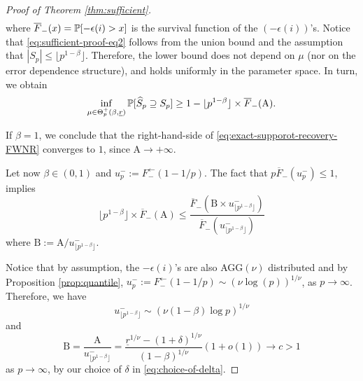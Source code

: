 \begin{proof}[Proof of Theorem \ref{thm:sufficient}]
\begin{align}
\end{align}
where $\overline{F}_-(x) = \P[-\epsilon(i)>x]$ is the survival function of the $(-\epsilon(i))$'s.
Notice that \eqref{eq:sufficient-proof-eq2} follows from the union bound and the assumption that ${|S_p|}\le{\lfloor p^{1-\beta}\rfloor}$. 
Therefore, the lower bound does not depend on $\mu$ (nor on the error dependence structure), and holds uniformly in the parameter space. In turn, we obtain 
\begin{equation} \label{eq:exact-supporot-recovery-FWNR}
    \inf_{\mu\in\Theta_p^+(\beta, \underline{r})} \P[\widehat{S}_p \supseteq S_p] \ge 1 - \lfloor p^{1-\beta} \rfloor \times \overline{F}_-(\text{A}).
\end{equation}

If $\beta=1$, we conclude that the right-hand-side of \eqref{eq:exact-supporot-recovery-FWNR} 
converges to $1$, since $\text{A}\to+\infty$.

Let now $\beta\in (0,1)$ and $u_p^- :=  F_-^{\leftarrow}(1-1/p)$. 
The fact that $p\overline{F}_-(u_p^-) \le 1$, implies
\begin{equation}
    \lfloor p^{1-\beta} \rfloor \times \overline{F}_-(\text{A}) \le 
    \frac{\overline{F}_-\left(\text{B}\times{u_{\lfloor p^{1-\beta}\rfloor}^-}\right)} {\overline{F}_-\left({u_{\lfloor p^{1-\beta}\rfloor}^-}\right)} \label{eq:sufficient-proof-eq3}
\end{equation}
where $\text{B} := {\text{A}}/{u_{\lfloor p^{1-\beta}\rfloor}^-}$.

Notice that by assumption, the $-\epsilon(i)$'s are also 
AGG$(\nu)$ distributed and by Proposition \ref{prop:quantile}, 
$u_p^{-}:= F_-^{\leftarrow}(1-1/p) \sim (\nu \log(p))^{1/\nu}$,
as $p\to\infty$. Therefore, we have
\begin{equation} \label{eq:sufficient-proof-eq4}
    u_{\lfloor p^{1-\beta}\rfloor}^- \sim \left(\nu(1-\beta)\log{p}\right)^{1/\nu}
\end{equation}
and 
\begin{equation*}
\text{B} = \frac{\text{A}}{u_{\lfloor p^{1-\beta}\rfloor}^-}
= \frac{\underline{r}^{1/\nu} - (1+\delta)^{1/\nu}}{(1-\beta)^{1/\nu}}\left(1+o(1)\right) \to c>1
\end{equation*}
as $p\to\infty$, by our choice of $\delta$ in \eqref{eq:choice-of-delta}.


\end{proof}
